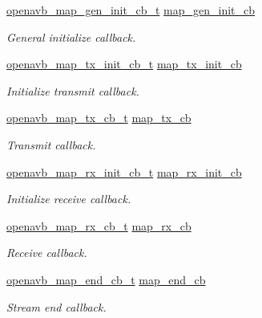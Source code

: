 \begin{DoxyCompactItemize}
\hyperlink{include_2openavb__map__pub_8h_adef9ba9bdab68111bf610b0191ed42c0}{openavb\+\_\+map\+\_\+gen\+\_\+init\+\_\+cb\+\_\+t} \hyperlink{structopenavb__map__cb__t_ae2e9b66edaa11de03638bbcc5f8414bf}{map\+\_\+gen\+\_\+init\+\_\+cb}
\begin{DoxyCompactList}\small\item\em General initialize callback. \end{DoxyCompactList}\item 
\hyperlink{include_2openavb__map__pub_8h_ab8a1a32191860b48831aafc89ccaf57d}{openavb\+\_\+map\+\_\+tx\+\_\+init\+\_\+cb\+\_\+t} \hyperlink{structopenavb__map__cb__t_a187e10e5170f1fc6d1162148f9edf2d9}{map\+\_\+tx\+\_\+init\+\_\+cb}
\begin{DoxyCompactList}\small\item\em Initialize transmit callback. \end{DoxyCompactList}\item 
\hyperlink{include_2openavb__map__pub_8h_aacd3a3b033edb3da91939cc2a24fa1b0}{openavb\+\_\+map\+\_\+tx\+\_\+cb\+\_\+t} \hyperlink{structopenavb__map__cb__t_a4a157fb8eb778c17724d3121c42bc9c7}{map\+\_\+tx\+\_\+cb}
\begin{DoxyCompactList}\small\item\em Transmit callback. \end{DoxyCompactList}\item 
\hyperlink{include_2openavb__map__pub_8h_ad8c1c0f6981fbc5bfa0ec0d3d2fec709}{openavb\+\_\+map\+\_\+rx\+\_\+init\+\_\+cb\+\_\+t} \hyperlink{structopenavb__map__cb__t_abb274346a258817c73be3d4860cd8c03}{map\+\_\+rx\+\_\+init\+\_\+cb}
\begin{DoxyCompactList}\small\item\em Initialize receive callback. \end{DoxyCompactList}\item 
\hyperlink{include_2openavb__map__pub_8h_aa55fc055522b567eaa2049a00f4894b7}{openavb\+\_\+map\+\_\+rx\+\_\+cb\+\_\+t} \hyperlink{structopenavb__map__cb__t_a354eb0e412d873e04ed0618f600f8fb1}{map\+\_\+rx\+\_\+cb}
\begin{DoxyCompactList}\small\item\em Receive callback. \end{DoxyCompactList}\item 
\hyperlink{include_2openavb__map__pub_8h_a607adcf171fe816c81cfeaf1eeed2808}{openavb\+\_\+map\+\_\+end\+\_\+cb\+\_\+t} \hyperlink{structopenavb__map__cb__t_ace0872ff88cbd5e79bdc4cf223f68421}{map\+\_\+end\+\_\+cb}
\begin{DoxyCompactList}\small\item\em Stream end callback. \end{DoxyCompactList}\item 

\end{DoxyCompactItemize}
